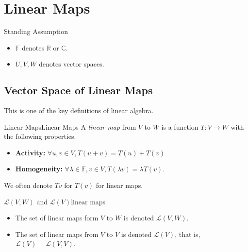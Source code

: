 \documentclass[../main.tex]{subfiles}
\begin{document}
\chapter{Linear Maps}

\begin{plainblackenv}
Standing Assumption
\tcblower\par
\begin{itemize}
\item $\mathbb{F}$ denotes $\mathbb{R}$ or $\mathbb{C}$.
\item $U,V,W$ denotes vector spaces.
\end{itemize}
\end{plainblackenv}

\section{Vector Space of Linear Maps}
This is one of the key definitions of linear algebra.
\begin{definition}{Linear Maps}{Linear Maps}
A \emph{linear map} from $V$ to $W$ is a function $T:V \rightarrow W$ with the following properties.
\begin{itemize}
	\item \textbf{Activity: } $\forall u,v \in V,T(u+v) = T(u) + T(v)$
	\item \textbf{Homogeneity: } $\forall \lambda \in \mathbb{F},v \in V, T(\lambda v) = \lambda T(v)$.
\end{itemize}

We often denote $Tv$ for $T(v)$ for linear maps.
\end{definition}

\begin{notation}{$\mathscr{L}(V,W)$ and $\mathscr{L}(V)$}{linear maps}
	\begin{itemize}
	\item The set of linear maps form $V$ to $W$ is denoted $\mathscr{L}(V,W)$.
	\item The set of linear maps from $V$ to $V$ is denoted $\mathscr{L}(V)$, that is, $\mathscr{L}(V) = \mathscr{L}(V,V)$.
	\end{itemize}
\end{notation}
\end{document}

